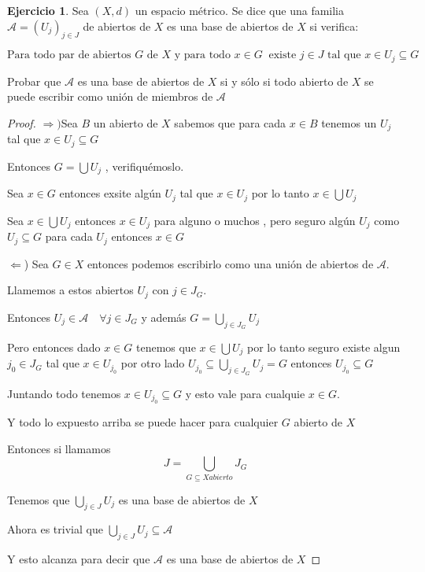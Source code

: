 \documentclass[12pt]{report}
\newcommand{\Ra}{\Rightarrow}
\theoremstyle{definition}
\newtheorem{ej}{Ejercicio}
\begin{document}
\begin{ej}
	Sea $(X,d)$ un espacio métrico. Se dice que una familia $\mathcal{A} = (U_j)_{j\in J}$ de abiertos de $X$ es una base de abiertos de $X$ si verifica:

	$$\text{Para todo par de abiertos } G \text{ de } X \text{ y para todo } x\in G \ \text{ existe } j\in  J \text{ tal que } x\in U_j \subseteq G$$

	Probar que $\mathcal{A}$ es una base de abiertos de $X$ si y sólo si todo abierto de $X$ se puede escribir como unión de miembros de $\mathcal{A}$

	\begin{proof}
		$\Ra )$Sea $B$ un abierto de $X$ sabemos que para cada $x \in B$ tenemos un $U_j$ tal que $x \in U_j \subseteq G$

		Entonces $G = \bigcup U_j$ , verifiquémoslo.

		Sea $x \in G$ entonces exsite algún $U_j$ tal que $x \in U_j$ por lo tanto $x \in \bigcup U_j$

		Sea $x \in \bigcup U_j$ entonces $x \in U_j$ para alguno o muchos , pero seguro algún $U_j$ como $U_j \subseteq G$ para cada $U_j$ entonces $x \in G$

		$\Leftarrow$) Sea $G \in X$ entonces podemos escribirlo como una unión de abiertos de $\mathcal{A}$.

		Llamemos a estos abiertos $U_j$ con $j \in J_G$.

		Entonces $U_j \in \mathcal{A} \quad \forall j \in J_G$ y además $G = \bigcup_{j \in J_G} U_j$

		Pero entonces dado $x \in G$ tenemos que $x \in \bigcup U_j$ por lo tanto seguro existe algun $j_0 \in J_G$ tal que $x \in U_{j_0}$ por otro lado $U_{j_0} \subseteq \bigcup_{j \in J_G} U_j = G$ entonces $U_{j_0} \subseteq G$

		Juntando todo tenemos $x \in U_{j_0} \subseteq G$ y esto vale para cualquie $x \in G$.

		Y todo lo expuesto arriba se puede hacer para cualquier $G$ abierto de $X$ 

		Entonces si llamamos $$J= \bigcup_{G\subseteq X abierto } J_G $$

		Tenemos que $\bigcup_{j\in J }U_j $ es una base de abiertos de $X$

		Ahora es trivial que $\bigcup_{j \in J} U_j \subseteq \mathcal{A}$

		Y esto alcanza para decir que $\mathcal{A}$ es una base de abiertos de $X$ 
	\end{proof}
	
	
\end{ej}
\end{document}
